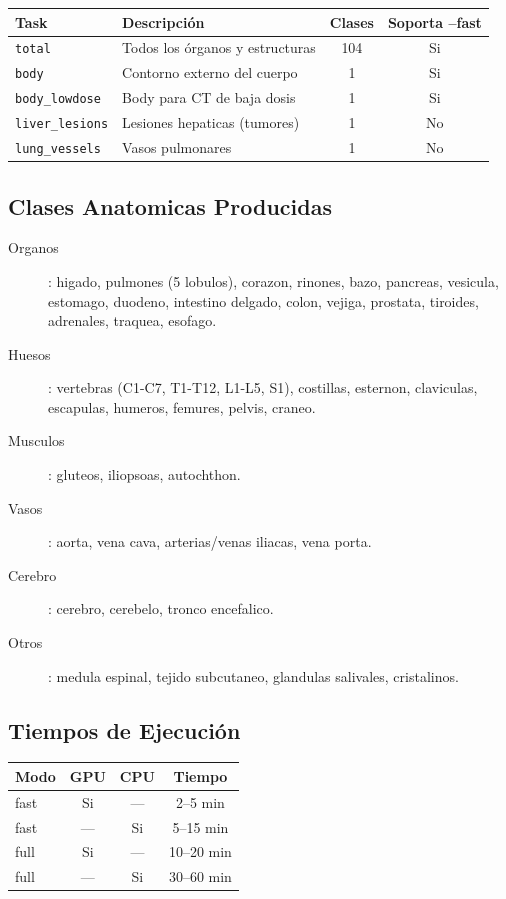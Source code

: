 \documentclass[12pt,a4paper]{article}
\begin{document}
\begin{table}[H]
\centering
\begin{tabular}{l l c c}
\toprule
\textbf{Task} & \textbf{Descripción} & \textbf{Clases} & \textbf{Soporta --fast} \\
\midrule
\texttt{total} & Todos los órganos y estructuras & 104 & Si \\
\texttt{body} & Contorno externo del cuerpo & 1 & Si \\
\texttt{body\_lowdose} & Body para CT de baja dosis & 1 & Si \\
\texttt{liver\_lesions} & Lesiones hepaticas (tumores) & 1 & No \\
\texttt{lung\_vessels} & Vasos pulmonares & 1 & No \\
\bottomrule
\end{tabular}
\end{table}

\subsection{Clases Anatomicas Producidas}

\begin{description}
    \item[Organos]: higado, pulmones (5 lobulos), corazon, rinones, bazo, pancreas,
          vesicula, estomago, duodeno, intestino delgado, colon, vejiga, prostata,
          tiroides, adrenales, traquea, esofago.
    \item[Huesos]: vertebras (C1-C7, T1-T12, L1-L5, S1), costillas, esternon,
          claviculas, escapulas, humeros, femures, pelvis, craneo.
    \item[Musculos]: gluteos, iliopsoas, autochthon.
    \item[Vasos]: aorta, vena cava, arterias/venas iliacas, vena porta.
    \item[Cerebro]: cerebro, cerebelo, tronco encefalico.
    \item[Otros]: medula espinal, tejido subcutaneo, glandulas salivales, cristalinos.
\end{description}

\subsection{Tiempos de Ejecución}

\begin{table}[H]
\centering
\begin{tabular}{l c c c}
\toprule
\textbf{Modo} & \textbf{GPU} & \textbf{CPU} & \textbf{Tiempo} \\
\midrule
fast & Si & --- & 2--5 min \\
fast & --- & Si & 5--15 min \\
full & Si & --- & 10--20 min \\
full & --- & Si & 30--60 min \\
\bottomrule
\end{tabular}
\end{table}
\end{document}

